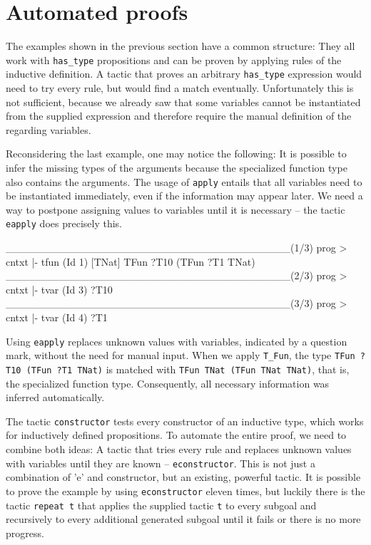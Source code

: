 \documentclass[fleqn]{scrreprt}
\newcommand{\coqinline}[1]{\texttt{#1}}
\begin{document}
\section{Automated proofs}
\label{autoproof}
The examples shown in the previous section have a common structure: They all work with \coqinline{has_type} propositions and can be proven by applying rules of the inductive definition. A tactic that proves an arbitrary \coqinline{has_type} expression would need to try every rule, but would find a match eventually. Unfortunately this is not sufficient, because we already saw that some variables cannot be instantiated from the supplied expression and therefore require the manual definition of the regarding variables.
\par
Reconsidering the last example, one may notice the following: It is possible to infer the missing types of the arguments because the specialized function type also contains the arguments. The usage of \coqinline{apply} entails that all variables need to be instantiated immediately, even if the information may appear later. We need a way to postpone assigning values to variables until it is necessary -- the tactic \coqinline{eapply} does precisely this. 
\begin{coqcode}
______________________________________(1/3)
prog > cntxt |- tfun (Id 1) [TNat] \in TFun ?T10 (TFun ?T1 TNat)
______________________________________(2/3)
prog > cntxt |- tvar (Id 3) \in ?T10
______________________________________(3/3)
prog > cntxt |- tvar (Id 4) \in ?T1
\end{coqcode}
Using \coqinline{eapply} replaces unknown values with variables, indicated by a question mark, without the need for manual input. When we apply \coqinline{T_Fun}, the type \coqinline{TFun ?T10 (TFun ?T1 TNat)} is matched with \coqinline{TFun TNat (TFun TNat TNat)}, that is, the specialized function type. Consequently, all necessary information was inferred automatically.
\par
The tactic \coqinline{constructor} tests every constructor of an inductive type, which works for inductively defined propositions. To automate the entire proof, we need to combine both ideas: A tactic that tries every rule and replaces unknown values with variables until they are known -- \coqinline{econstructor}. This is not just a combination of 'e' and constructor, but an existing, powerful tactic. It is possible to prove the example by using \coqinline{econstructor} eleven times, but luckily there is the tactic \coqinline{repeat t} that applies the supplied tactic \coqinline{t} to every subgoal and recursively to every additional generated subgoal until it fails or there is no more progress.
\end{document}
